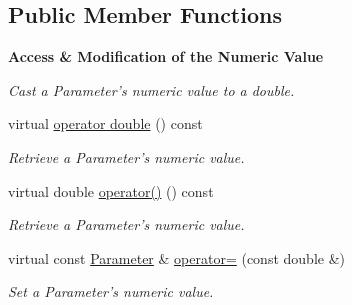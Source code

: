 \subsection*{Public Member Functions}
\begin{Indent}{\bf Access \& Modification of the Numeric Value}\par
{\em \label{_amgrpe80791dade181f608b19efd4011ae6ee}
 Cast a Parameter's numeric value to a double. }\begin{DoxyCompactItemize}
\item 
virtual \hyperlink{classeos_1_1Parameter_ad2dc69fe74e308328dc8a1d901c916ec}{operator double} () const 
\begin{DoxyCompactList}\small\item\em Retrieve a Parameter's numeric value. \item\end{DoxyCompactList}\item 
virtual double \hyperlink{classeos_1_1Parameter_ada58e0206d67777a79bdd2bc0c806600}{operator()} () const 
\begin{DoxyCompactList}\small\item\em Retrieve a Parameter's numeric value. \item\end{DoxyCompactList}\item 
virtual const \hyperlink{classeos_1_1Parameter}{Parameter} \& \hyperlink{classeos_1_1Parameter_aff29f9acdc90019e76239f6c81b4014a}{operator=} (const double \&)
\begin{DoxyCompactList}\small\item\em Set a Parameter's numeric value. \item\end{DoxyCompactList}\end{DoxyCompactItemize}
\end{Indent}
